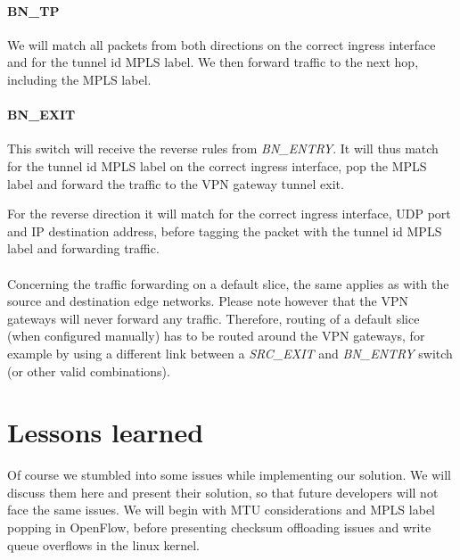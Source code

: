 \paragraph{BN\_TP} We will match all packets from both directions on the correct ingress interface and for the tunnel id MPLS label. We then forward traffic to the next hop, including the MPLS label.

\paragraph{BN\_EXIT} This switch will receive the reverse rules from \textit{BN\_ENTRY}. It will thus match for the tunnel id MPLS label on the correct ingress interface, pop the MPLS label and forward the traffic to the VPN gateway tunnel exit.

For the reverse direction it will match for the correct ingress interface, UDP port and IP destination address, before tagging the packet with the tunnel id MPLS label and forwarding traffic.

\paragraph{} Concerning the traffic forwarding on a default slice, the same applies as with the source and destination edge networks. Please note however that the VPN gateways will never forward any traffic. Therefore, routing of a default slice (when configured manually) has to be routed around the VPN gateways, for example by using a different link between a \textit{SRC\_EXIT} and \textit{BN\_ENTRY} switch (or other valid combinations).

\section{Lessons learned}
Of course we stumbled into some issues while implementing our solution. We will discuss them here and present their solution, so that future developers will not face the same issues. We will begin with MTU considerations and MPLS label popping in OpenFlow, before presenting checksum offloading issues and write queue overflows in the linux kernel.


